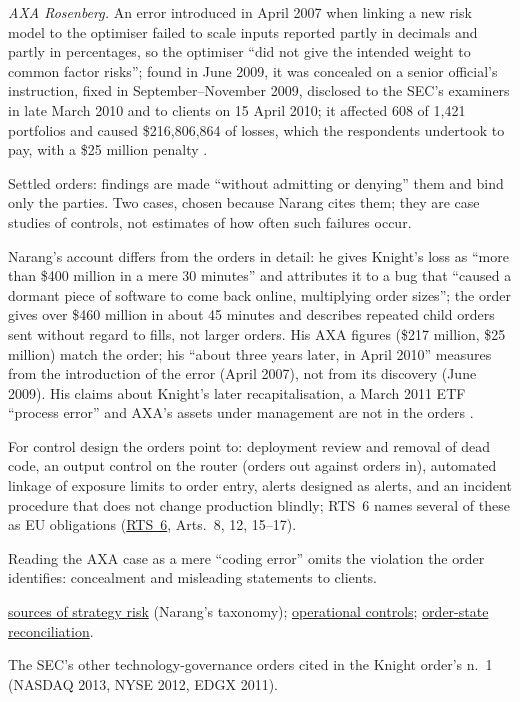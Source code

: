 \begin{qfevidence}
\emph{AXA Rosenberg.} An error introduced in April 2007 when linking a new risk model to the optimiser failed to scale inputs reported partly in decimals and partly in percentages, so the optimiser ``did not give the intended weight to common factor risks''; found in June 2009, it was concealed on a senior official's instruction, fixed in September--November 2009, disclosed to the SEC's examiners in late March 2010 and to clients on 15 April 2010; it affected 608 of 1{,}421 portfolios and caused \$216{,}806{,}864 of losses, which the respondents undertook to pay, with a \$25 million penalty \citep[paras.~1--3, 10--11, 33; sec.~IV, pp.~2--4, 10 and~16]{sec-axa-rosenberg-2011}.

 Settled orders: findings are made ``without admitting or denying'' them and bind only the parties. Two cases, chosen because Narang cites them; they are case studies of controls, not estimates of how often such failures occur.

 Narang's account \citep[sec.~10.1.3, pp.~195--196]{s7-narang} differs from the orders in detail: he gives Knight's loss as ``more than \$400 million in a mere 30 minutes'' and attributes it to a bug that ``caused a dormant piece of software to come back online, multiplying order sizes''; the order gives over \$460 million in about 45 minutes and describes repeated child orders sent without regard to fills, not larger orders. His AXA figures (\$217 million, \$25 million) match the order; his ``about three years later, in April 2010'' measures from the introduction of the error (April 2007), not from its discovery (June 2009). His claims about Knight's later recapitalisation, a March 2011 ETF ``process error'' and AXA's assets under management are not in the orders .

For control design the orders point to: deployment review and removal of dead code, an output control on the router (orders out against orders in), automated linkage of exposure limits to order entry, alerts designed as alerts, and an incident procedure that does not change production blindly; RTS~6 names several of these as EU obligations (\hyperref[rule:mifid-rts6-algorithmic-controls]{RTS~6}, Arts.~8, 12, 15--17).

 Reading the AXA case as a mere ``coding error'' omits the violation the order identifies: concealment and misleading statements to clients.

 \hyperref[def:quant-strategy-risk-sources]{sources of strategy risk} (Narang's taxonomy); \hyperref[meth:automated-trading-operational-controls]{operational controls}; \hyperref[mech:order-state-reconciliation]{order-state reconciliation}.

 The SEC's other technology-governance orders cited in the Knight order's n.~1 (NASDAQ 2013, NYSE 2012, EDGX 2011).

\end{qfevidence}
